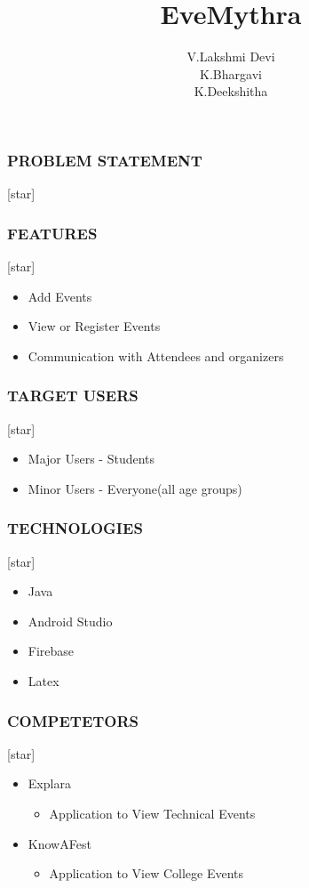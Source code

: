 \documentclass{beamer}
\title{EveMythra}
\author{V.Lakshmi Devi\\K.Bhargavi\\K.Deekshitha}
\begin{document}
    
    \begin{frame}
    \titlepage
    \end{frame}

    \begin{frame}
		\frametitle{PROBLEM STATEMENT}
    	[star]
    \end{frame}
	
    \begin{frame}
		\frametitle{FEATURES}
    	[star]
        \begin{itemize}
	    \item <1 -> Add Events
            \item <2 -> View or Register Events
            \item <3 -> Communication with Attendees and organizers
        \end{itemize}
    \end{frame}

    \begin{frame}
		\frametitle{TARGET USERS}
    	[star]
        \begin{itemize}
	    \item <1 -> Major Users - Students
            \item <2 -> Minor Users - Everyone(all age groups)        
        \end{itemize}
    \end{frame}
	
    \begin{frame}
		\frametitle{TECHNOLOGIES}
	[star]
	\begin{itemize}
		\item <1 -> Java
		\item <2 -> Android Studio
		\item <3 -> Firebase
		\item <4 -> Latex
	\end{itemize}
    \end{frame}

    \begin{frame}
		\frametitle{COMPETETORS}
    	[star]
        \begin{itemize}
            \item <1 -> Explara
		\begin{itemize}
			\item <2 -> Application to View Technical Events
		\end{itemize}
	    \item <3 -> KnowAFest
		\begin{itemize}
			\item <4 -> Application to View College Events 
		\end{itemize}                    
        \end{itemize}
    \end{frame}
\end{document}
